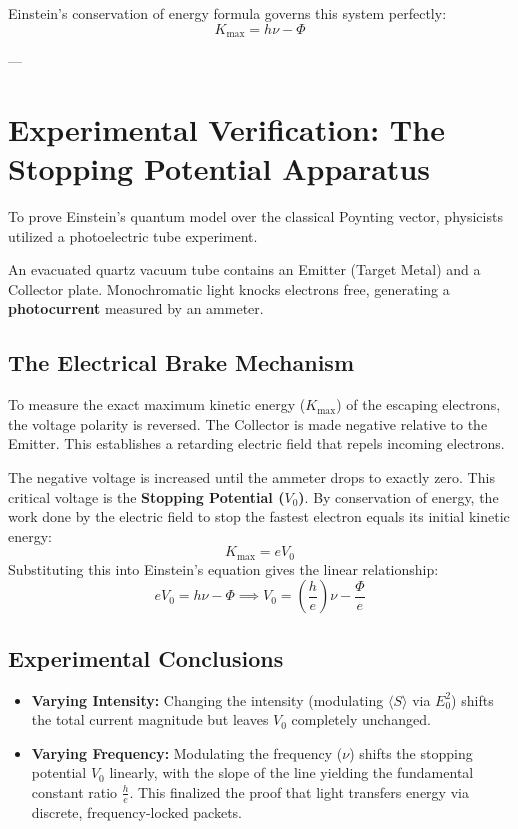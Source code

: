 \documentclass[11pt,a4paper]{article}
\begin{document}
	Einstein's conservation of energy formula governs this system perfectly:
	\begin{equation}
		K_{\text{max}} = h\nu - \Phi
	\end{equation}
	
	---
	
	\section{Experimental Verification: The Stopping Potential Apparatus}
	To prove Einstein's quantum model over the classical Poynting vector, physicists utilized a photoelectric tube experiment. 
	
	An evacuated quartz vacuum tube contains an Emitter (Target Metal) and a Collector plate. Monochromatic light knocks electrons free, generating a \textbf{photocurrent} measured by an ammeter.
	
	\subsection{The Electrical Brake Mechanism}
	To measure the exact maximum kinetic energy ($K_{\text{max}}$) of the escaping electrons, the voltage polarity is reversed. The Collector is made negative relative to the Emitter. This establishes a retarding electric field that repels incoming electrons.
	
	The negative voltage is increased until the ammeter drops to exactly zero. This critical voltage is the \textbf{Stopping Potential ($V_0$)}. By conservation of energy, the work done by the electric field to stop the fastest electron equals its initial kinetic energy:
	\begin{equation}
		K_{\text{max}} = e V_0
	\end{equation}
	Substituting this into Einstein's equation gives the linear relationship:
	\begin{equation}
		e V_0 = h\nu - \Phi \implies V_0 = \left(\frac{h}{e}\right)\nu - \frac{\Phi}{e}
	\end{equation}
	
	\subsection{Experimental Conclusions}
	\begin{itemize}
		\item \textbf{Varying Intensity:} Changing the intensity (modulating $\langle S \rangle$ via $E_0^2$) shifts the total current magnitude but leaves $V_0$ completely unchanged. 
		\item \textbf{Varying Frequency:} Modulating the frequency ($\nu$) shifts the stopping potential $V_0$ linearly, with the slope of the line yielding the fundamental constant ratio $\frac{h}{e}$. This finalized the proof that light transfers energy via discrete, frequency-locked packets.
	\end{itemize}
	
\end{document}
